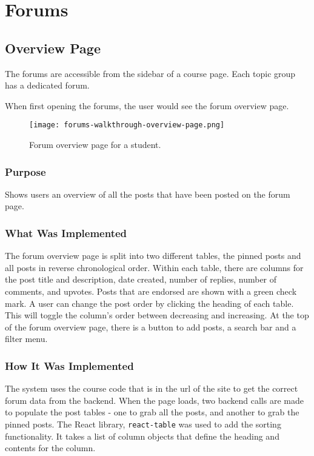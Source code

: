 \section{Forums}

\subsection{Overview Page}
The forums are accessible from the sidebar of a course page. Each topic group has a dedicated forum.

When first opening the forums, the user would see the forum overview page.

\newpage

\begin{figure}[h!]
    \texttt{[image: forums-walkthrough-overview-page.png]}
    \centering
    \caption{Forum overview page for a student.}
\end{figure}

\subsubsection{Purpose}
Shows users an overview of all the posts that have been posted on the forum page.

\subsubsection{What Was Implemented}
The forum overview page is split into two different tables, the pinned posts and all posts in reverse chronological order.
Within each table, there are columns for the post title and description, date created, number of replies, number of comments, and upvotes.
Posts that are endorsed are shown with a green check mark.
A user can change the post order by clicking the heading of each table. This will toggle the column's order between decreasing and increasing.
At the top of the forum overview page, there is a button to add posts, a search bar and a filter menu.

\subsubsection{How It Was Implemented}
The system uses the course code that is in the url of the site to get the correct forum data from the backend.
When the page loads, two backend calls are made to populate the post tables - one to grab all the posts, and another to grab the pinned posts.
The React library, \texttt{react-table} was used to add the sorting functionality.
It takes a list of column objects that define the heading and contents for the column.


